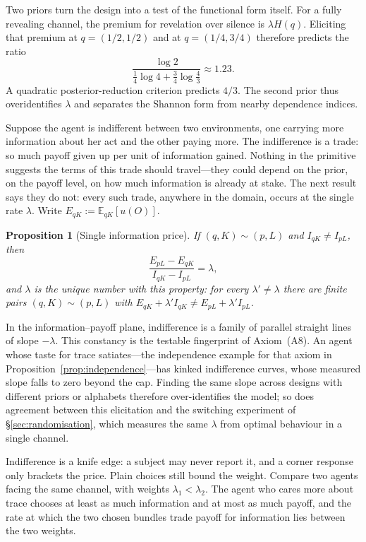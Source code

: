 \documentclass[11pt,a4paper]{article}
\newtheorem{proposition}[theorem]{Proposition}
\theoremstyle{definition}
\newcommand{\E}{\mathbb E}
\newcommand{\I}{I}
\newcommand{\Sh}{H}
\newcommand{\1}{\mathbf 1}
\begin{document}
Two priors turn the design into a test of the functional form itself.  For a fully revealing channel, the
premium for revelation over silence is $\lambda\Sh(q)$.  Eliciting that premium at $q=(1/2,1/2)$ and at
$q=(1/4,3/4)$ therefore predicts the ratio
\[
 \frac{\log 2}{\frac14\log4+\frac34\log\frac43}
 \approx1.23.
\]
A quadratic posterior-reduction criterion predicts $4/3$.  The second prior thus overidentifies $\lambda$ and
separates the Shannon form from nearby dependence indices.

Suppose the agent is indifferent between two environments, one carrying more information about her act and the
other paying more.  The indifference is a trade: so much payoff given up per unit of information gained.
Nothing in the primitive suggests the terms of this trade should travel---they could depend on the prior, on the
payoff level, on how much information is already at stake.  The next result says they do not: every such trade,
anywhere in the domain, occurs at the single rate $\lambda$.  Write $E_{qK}:=\E_{qK}[u(O)]$.

\begin{proposition}[Single information price]\label{prop:single-price}
If $(q,K)\sim(p,L)$ and $\I_{qK}\ne\I_{pL}$, then
\[
 \frac{E_{pL}-E_{qK}}{\I_{qK}-\I_{pL}}=\lambda,
\]
and $\lambda$ is the unique number with this property: for every $\lambda'\ne\lambda$ there are finite pairs
$(q,K)\sim(p,L)$ with $E_{qK}+\lambda'\I_{qK}\ne E_{pL}+\lambda'\I_{pL}$.
\end{proposition}

In the information--payoff plane, indifference is a family of
parallel straight lines of slope $-\lambda$.  This constancy is the testable fingerprint of
Axiom~\textup{(A8)}.  An agent whose taste for trace satiates---the independence example for that axiom in
Proposition~\ref{prop:independence}---has kinked indifference curves, whose measured slope falls to zero beyond
the cap.  Finding the same slope across designs with different priors or alphabets therefore over-identifies the
model; so does agreement between this elicitation and the switching experiment of \S\ref{sec:randomisation},
which measures the same $\lambda$ from optimal behaviour in a single channel.

Indifference is a knife edge: a subject may never report it, and a corner response only brackets the price.
Plain choices still bound the weight.  Compare two agents facing the same channel, with weights
$\lambda_1<\lambda_2$.  The agent who cares more about trace chooses at least as much information and at most as
much payoff, and the rate at which the two chosen bundles trade payoff for information lies between the two
weights.
\end{document}
